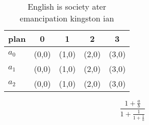 \documentclass[a4paper]{article}
\begin{document}
\begin{table}
\begin{adjustbox}{width=0.6\columnwidth}
\begin{tabular}{|l|l|l|l|l|}
\hline
\textbf{plan} & \multicolumn{1}{c|}{\textbf{0}} & \multicolumn{1}{c|}{\textbf{1}} & \multicolumn{1}{c|}{\textbf{2}} & \multicolumn{1}{c|}{\textbf{3}} \\ \hline
\textbf{$a_0$}  & (0,0) & (1,0) & (2,0) & (3,0) \\ \hline
\textbf{$a_1$}  & (0,0) & (1,0) & (2,0) & (3,0) \\ \hline
\textbf{$a_2$}  & (0,0) & (1,0) & (2,0) & (3,0) \\ \hline
\end{tabular}
\end{adjustbox}
\caption{English is society ater emancipation kingston ian
}
\end{table}

\[ \frac{1+\frac{a}{b}}{1+\frac{1}{1+\frac{1}{a}}} \]
\end{document}
